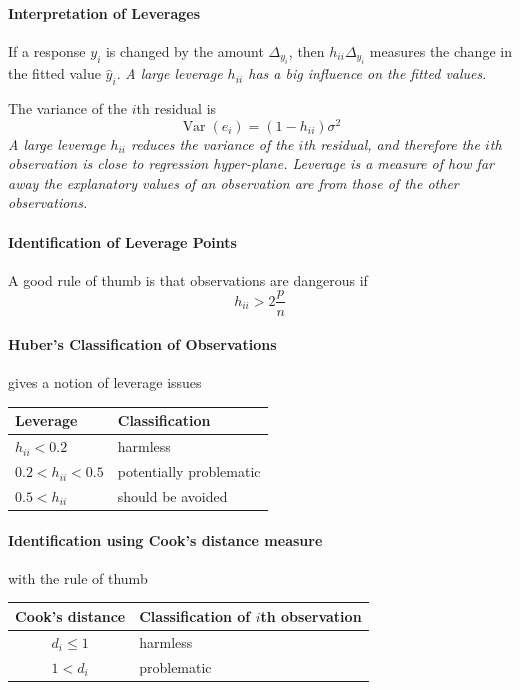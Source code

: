 \documentclass[11pt]{article}
\theoremstyle{definition}
\newcommand*\Var[1]{\mathop{\text{Var}}\left(#1\right)}
\begin{document}
\paragraph{Interpretation of Leverages}
If a response $y_i$ is changed by the amount $\Delta_{y_i}$, then $h_{ii}\Delta_{y_i}$ measures the change in the fitted value $\hat{y}_i$. \textit{A large leverage $h_{ii}$ has a big influence on the fitted values}.

The variance of the $i$th residual is 
\begin{equation*}
	\Var{e_i} = (1-h_{ii})\sigma^2
\end{equation*}
\textit{A large leverage $h_{ii}$ reduces the variance of the $i$th residual, and therefore the $i$th observation is close to regression hyper-plane. Leverage is a measure of how far away the explanatory values of an observation are from those of the other observations.}

\paragraph{Identification of Leverage Points}
A good rule of thumb is that observations are dangerous if
\begin{equation*}
	h_{ii} > 2\frac{p}{n}
\end{equation*}

\paragraph{Huber's Classification of Observations} gives a notion of leverage issues
\vspace*{1em}
\begin{tabularx}{\linewidth}{X X}
	\textbf{Leverage} & \textbf{Classification} \\
	\hline
	$h_{ii} < 0.2$ & harmless \\
	$0.2 < h_{ii} < 0.5$ & potentially problematic \\
	$0.5 < h_{ii}$ & should be avoided \\
\end{tabularx}

\paragraph{Identification using Cook's distance measure} with the rule of thumb
\begin{tabularx}{\linewidth}{c X}
	\textbf{Cook's distance} & \textbf{Classification of $i$th observation} \\
	\hline
	$d_i \leq 1$ & harmless \\
	$1 < d_i$ & problematic
\end{tabularx}
\end{document}
